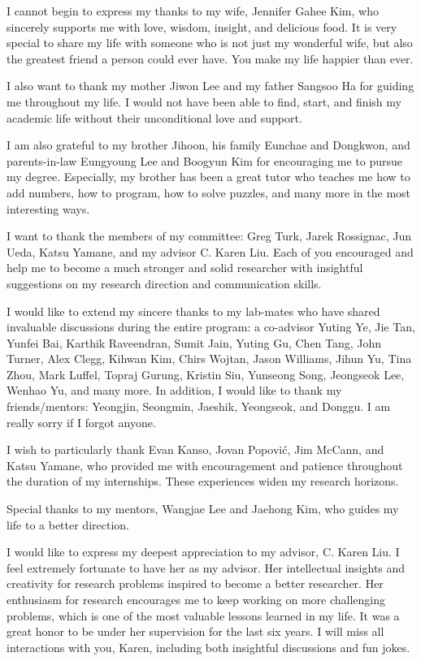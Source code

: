 I cannot begin to express my thanks to my wife, Jennifer Gahee Kim,
who sincerely supports me with love, wisdom, insight, and delicious food.
It is very special to share my life with someone who is not just my wonderful
wife, but also the greatest friend a person could ever have.
You make my life happier than ever.

I also want to thank my mother Jiwon Lee and my father Sangsoo Ha for 
guiding me throughout my life.
I would not have been able to find, start, and finish my academic life without
their unconditional love and support.

I am also grateful to my brother Jihoon, his family Eunchae and Dongkwon,
and parents-in-law Eungyoung Lee and Boogyun Kim for encouraging me to pursue
my degree.
Especially, my brother has been a great tutor who teaches me
how to add numbers, how to program, how to solve puzzles, and many more
in the most interesting ways.

I want to thank the members of my committee: Greg Turk, Jarek Rossignac,
Jun Ueda, Katsu Yamane, and my advisor C. Karen Liu.
Each of you encouraged and help me to become a much stronger and solid
researcher with insightful suggestions on my research direction and
communication skills.

I would like to extend my sincere thanks to my lab-mates
who have shared invaluable discussions during the entire program:
a co-advisor Yuting Ye, Jie Tan, Yunfei Bai, Karthik Raveendran, 
Sumit Jain, Yuting Gu, Chen Tang, John Turner, Alex Clegg, Kihwan Kim, 
Chirs Wojtan, Jason Williams, Jihun Yu, Tina Zhou, Mark Luffel, 
Topraj Gurung, Kristin Siu, Yunseong Song,
Jeongseok Lee, Wenhao Yu, and many more.
In addition, I would like to thank my friends/mentors: Yeongjin, Seongmin,
Jaeshik, Yeongseok, and Donggu.
I am really sorry if I forgot anyone.

I wish to particularly thank Evan Kanso, Jovan Popovi\'{c}, Jim McCann, and
Katsu Yamane, who provided me with encouragement and patience throughout the
duration of my internships. These experiences widen my research horizons.

Special thanks to my mentors, Wangjae Lee and Jaehong Kim, who
guides my life to a better direction.

I would like to express my deepest appreciation to my advisor, C. Karen Liu.
I feel extremely fortunate to have her as my advisor.
Her intellectual insights and creativity for research problems
inspired to become a better researcher.
Her enthusiasm for research encourages me to keep working on more challenging
problems, which is one of the most valuable lessons learned in my life.
It was a great honor to be under her supervision for the last six years.
I will miss all interactions with you, Karen, 
including both insightful discussions and fun jokes. 












